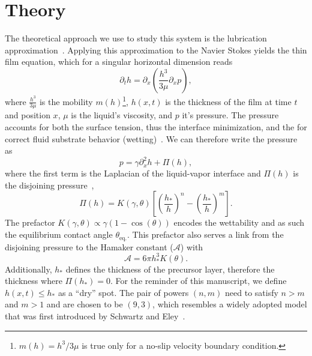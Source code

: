 \documentclass[twocolumn,amsmath,amssymb,showpacs,pre,nofootinbib,superscriptaddress]{revtex4-1} %
\begin{document}
\section{Theory}\label{sec:theory}
The theoretical approach we use to study this system is the lubrication approximation~\cite{Reynolds, RevModPhys.69.931, PhysRevE.63.011208}.
Applying this approximation to the Navier Stokes yields the thin film equation, which for a singular horizontal dimension reads~\cite{RevModPhys.81.739, RevModPhys.81.1131, THIELE2014399}
\begin{equation}\label{eq:thin_film_simple}
    \partial_t h = \partial_x \left(\frac{h^3}{3\mu}\partial_x p\right),
\end{equation}
where $\frac{h^3}{3\mu}$ is the mobility $m(h)$\footnote{$m(h) = h^3/3\mu$ is true only for a no-slip velocity boundary condition.}, $h(x,t)$ is the thickness of the film at time $t$ and position $x$, $\mu$ is the liquid's viscosity, and $p$ it's pressure.
The pressure accounts for both the surface tension, thus the interface minimization, and the for correct fluid substrate behavior (wetting)~\cite{PhysRevE.100.033313}.
We can therefore write the pressure as
\begin{equation}\label{eq:pressure}
    p = \gamma \partial_x^2 h + \Pi(h),
\end{equation}
where the first term is the Laplacian of the liquid-vapor interface and $\Pi(h)$ is the disjoining pressure~\cite{RevModPhys.69.931, RevModPhys.81.739, Peschka9275, PhysRevE.63.011208},
\begin{equation}\label{eq:disjoin}
    \Pi(h) = K(\gamma,\theta)\left[\left(\frac{h_{\ast}}{h}\right)^n - \left(\frac{h_{\ast}}{h}\right)^m\right].
\end{equation}
The prefactor $K(\gamma,\theta)\propto \gamma(1-\cos(\theta))$ encodes the wettability and as such the equilibrium contact angle $\theta_{\text{eq.}}$.
This prefactor also serves a link from the disjoining pressure to the Hamaker constant ($\mathcal{A}$) with~~\cite{PhysRevE.93.013120, bestehorn20033d, van1988interfacial}
\begin{equation}
    \mathcal{A} = 6\pi h_{\ast}^3 K(\theta).    
\end{equation}
Additionally, $h_{\ast}$ defines the thickness of the precursor layer, therefore the thickness where $\Pi(h_{\ast}) = 0$.
For the reminder of this manuscript, we define $h(x,t) \le h_{\ast}$ as a ``dry'' spot.
The pair of powers $(n,m)$ need to satisfy $n > m$ and $m > 1$ and are chosen to be $(9,3)$, which resembles a  widely adopted model that was first introduced by Schwartz and Eley~\cite{SCHWARTZ1998173, RevModPhys.81.739}.
\end{document}
